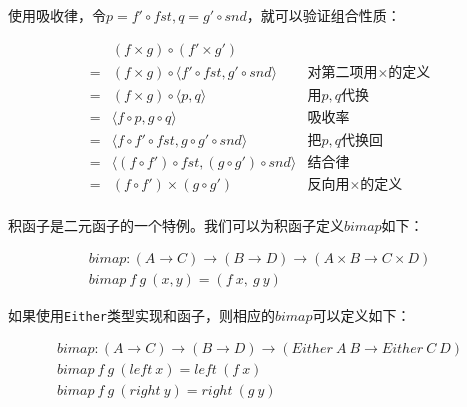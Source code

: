 \documentclass[b5paper]{ctexart}
\begin{document}
\begin{mdframed}
使用吸收律，令$p = f' \circ fst, q = g' \circ snd$，就可以验证组合性质：

\[
\begin{array}{cll}
  & (f \times g) \circ (f' \times g') & \\
= & (f \times g) \circ \langle f' \circ fst, g' \circ snd \rangle & \text{对第二项用$\times$的定义} \\
= & (f \times g) \circ \langle p, q \rangle & \text{用$p, q$代换} \\
= & \langle f \circ p, g \circ q \rangle & \text{吸收率} \\
= & \langle f \circ f' \circ fst, g \circ g' \circ snd \rangle & \text{把$p, q$代换回} \\
= & \langle (f \circ f') \circ fst, (g \circ g') \circ snd \rangle & \text{结合律} \\
= & (f \circ f') \times (g \circ g') & \text{反向用$\times$的定义} \\
\end{array}
\]

\end{mdframed}

积函子是二元函子的一个特例。我们可以为积函子定义$bimap$如下：

\[
\begin{array}{l}
bimap : (A \to C) \to (B \to D) \to (A \times B \to C \times D) \\
bimap\ f\ g\ (x, y) = (f\ x,\ g\ y)
\end{array}
\]

如果使用\texttt{Either}类型实现和函子，则相应的$bimap$可以定义如下：

\[
\begin{array}{l}
bimap : (A \to C) \to (B \to D) \to (Either\ A\ B \to Either\ C\ D) \\
bimap\ f\ g\ (left\ x) = left\ (f\ x) \\
bimap\ f\ g\ (right\ y) = right\ (g\ y)
\end{array}
\]

\begin{Exercise}\label{ex:product-coproduct}
\end{Exercise}
\end{document}
